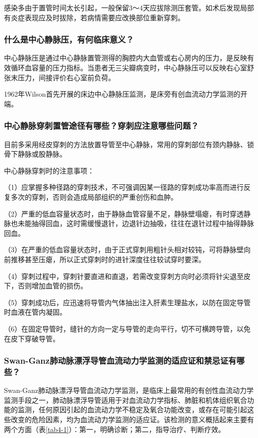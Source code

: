 感染多由于置管时间太长引起，一般保留3～4天应拔除测压套管。如术后发现局部有炎症表现应及时拔除，若病情需要应改换部位重新穿刺。

\subsubsection{什么是中心静脉压，有何临床意义？}

中心静脉压是通过中心静脉置管测得的胸腔内大血管或右心房内的压力，是反映有效循环血容量的压力指标。当患者无三尖瓣病变时，中心静脉压可以反映右心室舒张末压力，间接评价右心室前负荷。

1962年Wilson首先开展的床边中心静脉压监测，是床旁有创血流动力学监测的开端。

\subsubsection{中心静脉穿刺置管途径有哪些？穿刺应注意哪些问题？}

目前多采用经皮穿刺的方法放置导管至中心静脉，常用的穿刺部位有颈内静脉、锁骨下静脉或股静脉。

中心静脉穿刺时的注意事项：

（1）应掌握多种径路的穿刺技术，不可强调因某一径路的穿刺成功率高而进行反复多次的穿刺，否则会造成局部组织的严重创伤和血肿。

（2）严重的低血容量状态时，由于静脉血管容量不足，静脉壁塌瘪，有时穿透静脉也未能抽得回血，这时需缓慢退针，边退针边抽吸，往往在退针过程中抽得静脉回血。

（3）在严重的低血容量状态时，由于正式穿刺用粗针头相对较钝，可将静脉壁向前推移甚至压瘪，所以正式穿刺时的进针深度往往较试穿时要深。

（4）穿刺过程中，穿刺针要直进和直退，若需改变穿刺方向时必须将针尖退至皮下，否则增加血管的损伤。

（5）穿刺成功后，应迅速将导管内气体抽出注入肝素生理盐水，以防在固定导管时血液在管内凝固。

（6）在固定导管时，缝针的方向一定与导管的走向平行，切不可横跨导管，以免在皮下穿破导管。

\subsubsection{Swan-Ganz肺动脉漂浮导管血流动力学监测的适应证和禁忌证有哪些？}

Swan-Ganz肺动脉漂浮导管血流动力学监测，是临床上最常用的有创性血流动力学监测手段之一，肺动脉漂浮导管适用于对血流动力学指标、肺脏和机体组织氧合功能的监测，任何原因引起的血流动力学不稳定及氧合功能改变，或存在可能引起这些改变的危险因素，均为血流动力学监测的适应证。该检测的意义概括起来主要有两个方面（表\ref{tab4-1}）：第一，明确诊断；第二，指导治疗、判断疗效。


